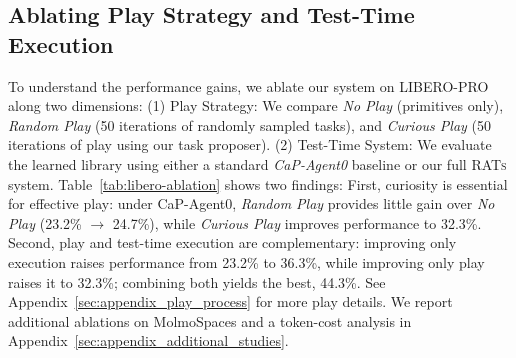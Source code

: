 \documentclass{llmxive}
\begin{document}
\subsection{Ablating Play Strategy and Test-Time Execution}
\label{subsec:ablation}
To understand the performance gains, we ablate our system on LIBERO-PRO along two dimensions:
(1) Play Strategy: We compare \emph{No Play} (primitives only), \emph{Random Play} (50 iterations of randomly sampled tasks), and \emph{Curious Play} (50 iterations of play using our task proposer).
(2) Test-Time System: We evaluate the learned library using either a standard \emph{CaP-Agent0} baseline or our full \textsc{RATs} system.
Table~\ref{tab:libero-ablation} shows two findings:
First, curiosity is essential for effective play: under CaP-Agent0, \emph{Random Play} provides little gain over \emph{No Play} (23.2\% $\to$ 24.7\%), while \emph{Curious Play} improves performance to 32.3\%.
Second, play and test-time execution are complementary: improving only execution raises performance from 23.2\% to 36.3\%, while improving only play raises it to 32.3\%; combining both yields the best, 44.3\%. See Appendix~\ref{sec:appendix_play_process} for more play details. We report additional ablations on MolmoSpaces and a token-cost analysis in Appendix~\ref{sec:appendix_additional_studies}.
\end{document}
